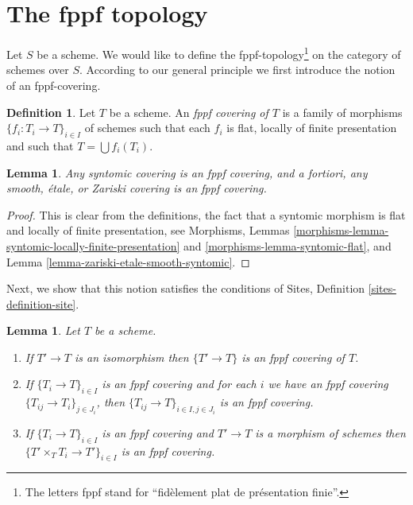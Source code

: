 \documentclass{stacks-project}
\theoremstyle{plain}
\newtheorem{lemma}[subsection]{Lemma}
\theoremstyle{definition}
\newtheorem{definition}[subsection]{Definition}
\theoremstyle{remark}
\numberwithin{equation}{subsection}
\begin{document}
\section{The fppf topology}
\label{section-fppf}

\noindent
Let $S$ be a scheme. We would like to define the fppf-topology\footnote{
The letters fppf stand for ``fid\`element plat de pr\'esentation finie''.} on
the category of schemes over $S$. According to our general principle
we first introduce the notion of an fppf-covering.

\begin{definition}
\label{definition-fppf-covering}
Let $T$ be a scheme. An {\it fppf covering of $T$} is a family
of morphisms $\{f_i : T_i \to T\}_{i \in I}$ of schemes
such that each $f_i$ is flat, locally of finite presentation and such
that $T = \bigcup f_i(T_i)$.
\end{definition}

\begin{lemma}
\label{lemma-zariski-etale-smooth-syntomic-fppf}
Any syntomic covering is an fppf covering, and a fortiori,
any smooth, \'etale, or Zariski covering is an fppf covering.
\end{lemma}

\begin{proof}
This is clear from the definitions, the fact that a syntomic morphism
is flat and locally of finite presentation, see
Morphisms, Lemmas
\ref{morphisms-lemma-syntomic-locally-finite-presentation} and
\ref{morphisms-lemma-syntomic-flat},
and
Lemma \ref{lemma-zariski-etale-smooth-syntomic}.
\end{proof}

\noindent
Next, we show that this notion satisfies the conditions of
Sites, Definition \ref{sites-definition-site}.

\begin{lemma}
\label{lemma-fppf}
Let $T$ be a scheme.
\begin{enumerate}
\item If $T' \to T$ is an isomorphism then $\{T' \to T\}$
is an fppf covering of $T$.
\item If $\{T_i \to T\}_{i\in I}$ is an fppf covering and for each
$i$ we have an fppf covering $\{T_{ij} \to T_i\}_{j\in J_i}$, then
$\{T_{ij} \to T\}_{i \in I, j\in J_i}$ is an fppf covering.
\item If $\{T_i \to T\}_{i\in I}$ is an fppf covering
and $T' \to T$ is a morphism of schemes then
$\{T' \times_T T_i \to T'\}_{i\in I}$ is an fppf covering.
\end{enumerate}
\end{lemma}
\end{document}
